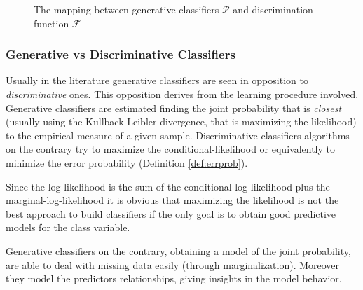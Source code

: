 \documentclass[11pt,a4paper, twoside]{book}
\newcommand{\Pp}{\operatorname{P}}
\begin{document}
\begin{figure}
\centering
{}
\caption{The mapping between generative classifiers $\mathcal{P}$ and discrimination function $\mathcal{F}$}
\label{fig:map}
\end{figure}



\subsubsection{Generative vs Discriminative Classifiers}

Usually in the literature generative classifiers are seen in opposition to \textit{discriminative} ones. This opposition derives from the learning procedure involved.
Generative classifiers are estimated finding the joint probability that is \textit{closest} (usually using the Kullback-Leibler divergence, that  is maximizing the likelihood) to the empirical measure of a given sample. 
Discriminative classifiers algorithms on the contrary try to maximize the conditional-likelihood or equivalently to minimize the error probability (Definition \ref{def:errprob}).

Since the log-likelihood is the sum of the conditional-log-likelihood plus the marginal-log-likelihood it is obvious that maximizing the likelihood is not the best approach to build classifiers if the only goal is to obtain good predictive models for the class variable.

Generative classifiers on the contrary, obtaining a model of the joint probability, are able to deal with missing data easily (through marginalization). Moreover they model the  predictors relationships, giving insights in the model behavior.
\end{document}
